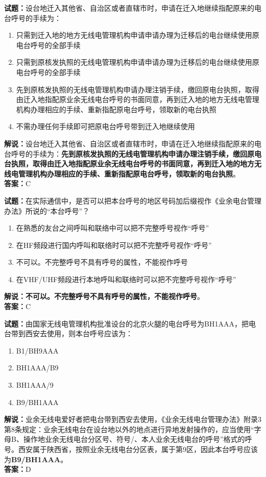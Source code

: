 \documentclass{ctexbook}
\begin{document}
\noindent\textbf{试题：}设台地迁入其他省、自治区或者直辖市时，申请在迁入地继续指配原来的电台呼号的手续为：
\begin{enumerate}[leftmargin=3em]
	\item 只需到迁入地的地方无线电管理机构申请申请办理为迁移后的电台继续使用原电台呼号的全部手续
	\item 只需到原核发执照的无线电管理机构申请申请办理为迁移后的电台继续使用原电台呼号的全部手续
	\item 先到原核发执照的无线电管理机构申请办理注销手续，缴回原电台执照，取得由迁入地指配原业余无线电台呼号的书面同意，再到迁入地的地方无线电管理机构办理相应的手续、重新指配原电台呼号，领取新的电台执照
	\item 不需办理任何手续即可把原电台呼号带到迁入地继续使用
\end{enumerate}
\noindent\textbf{解说：}设台地迁入其他省、自治区或者直辖市时，申请在迁入地继续指配原来的电台呼号的手续为：\textbf{先到原核发执照的无线电管理机构申请办理注销手续，缴回原电台执照，取得由迁入地指配原业余无线电台呼号的书面同意，再到迁入地的地方无线电管理机构办理相应的手续、重新指配原电台呼号，领取新的电台执照}。\\\noindent\textbf{答案：}C




\bigskip


\noindent\textbf{试题：}在实际通信中，是否可以把本台呼号的地区号码加后缀视作《业余电台管理办法》所说的“本台呼号”？
\begin{enumerate}[leftmargin=3em]
	\item 在熟悉的友台之间呼叫和联络中可以把不完整呼号视作“呼号”
	\item 在HF频段进行国内呼叫和联络时可以把不完整呼号视作“呼号”
	\item 不可以。不完整呼号不具有呼号的属性，不能视作呼号
	\item 在VHF/UHF频段进行本地呼叫和联络时可以把不完整呼号视作“呼号”
\end{enumerate}
\textbf{解说：不可以。不完整呼号不具有呼号的属性，不能视作呼号}。\\\noindent\textbf{答案：}C


\bigskip


\noindent\textbf{试题：}由国家无线电管理机构批准设台的北京火腿的电台呼号为BH1AAA，把电台带到西安去使用，则本台呼号应该为：
\begin{enumerate}[leftmargin=3em]
	\item B1/BH9AAA
	\item BH1AAA/B9
	\item BH1AAA/9
	\item B9/BH1AAA
\end{enumerate}
\noindent\textbf{解说：}业余无线电爱好者把电台带到西安去使用，《业余无线电台管理办法》附录3第8条规定：业余无线电台在设台地以外的地点进行异地发射操作的，应当使用“字母B、操作地业余无线电台分区号、符号/、本人业余无线电台的呼号”格式的呼号。西安属于陕西省，按照业余无线电台分区表，属于第9区，因此本台呼号应该为\textbf{B9/BH1AAA}。\\\noindent\textbf{答案：}D
\end{document}
